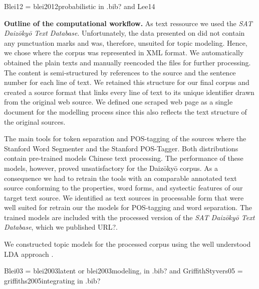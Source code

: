 \documentclass[a4paper,10pt]{article}
\newcommand{\TODO}[1]{\begingroup\color{red}#1\endgroup}
\newcommand{\NR}[1]{\begingroup\color{orange}#1\endgroup}
\begin{document}
\TODO{Blei12 = blei2012probabilistic in .bib? and Lee14}

\textbf{Outline of the computational workflow.} \NR{As text ressource we 
used the \textit{SAT Daiz{\=o}ky{\=o} Text Database}. Unfortunately, the data presented on 
\cite{Daizokyo} did not contain any punctuation marks and was, therefore,
unsuited for topic modeling. Hence, we chose \TODO{\cite{DaiCD}} where the 
corpus was represented in XML format. We automatically obtained the plain texts and 
manually reencoded the files for further processing.} The content is semi-structured by
references to the source and the sentence number for each line of text. We
retained this structure for our final corpus and created a source format
that links every line of text to its unique identifier drawn from the
original web source. We defined one scraped web page as a single document
for the modelling process since this also reflects the text structure of
the original sources.
    
  The main tools for token separation and POS-tagging of the sources where
  the Stanford Word Segmenter and the Stanford POS-Tagger. Both
  distributions contain pre-trained models Chinese text processing. The
  performance of these models, however, proved unsatisfactory for the
  Daiz{\=o}ky{\=o} corpus. As a consequence we had to retrain the tools
  with an comparable annotated text source conforming to the properties,
  word forms, and \TODO{systectic} features of our target text source.  We
  identified \cite{Lee:12,Wong:16} as text sources in processable form that
  were well suited for retrain our the models for POS-tagging and 
  word separation. The trained models are included with the
  processed version of the \textit{SAT Daiz{\=o}ky{\=o} Text Database},
  which we published \TODO{URL?}.  

  We constructed topic models for the processed corpus using the well
  understood LDA approach \cite{Blei03,GriffithStyvers05}.
  
  \TODO{Blei03 = blei2003latent or blei2003modeling, in .bib? and GriffithStyvers05
  = griffiths2005integrating in .bib?}

\end{document}

